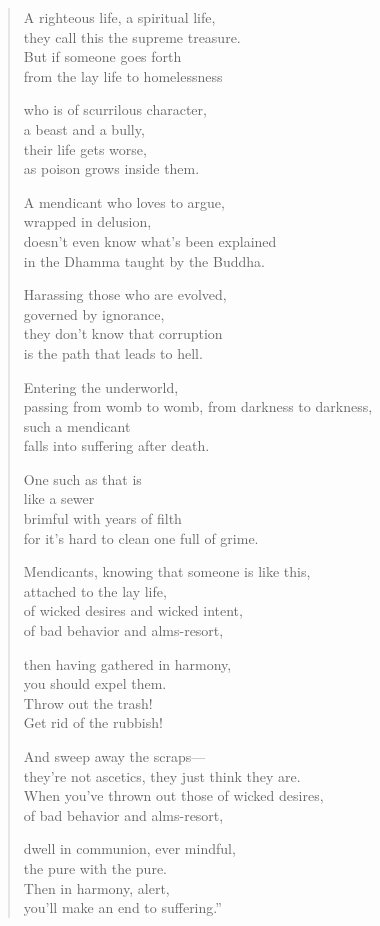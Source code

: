 \documentclass[12pt,openany]{book}%
\begin{document}
\begin{verse}%
A righteous life, a spiritual life, \\
they call this the supreme treasure. \\
But if someone goes forth \\
from the lay life to homelessness 

who is of scurrilous character, \\
a beast and a bully, \\
their life gets worse, \\
as poison grows inside them. 

A mendicant who loves to argue, \\
wrapped in delusion, \\
doesn’t even know what’s been explained \\
in the Dhamma taught by the Buddha. 

Harassing those who are evolved, \\
governed by ignorance, \\
they don’t know that corruption \\
is the path that leads to hell. 

Entering the underworld, \\
passing from womb to womb, from darkness to darkness, \\
such a mendicant \\
falls into suffering after death. 

One such as that is \\
like a sewer \\
brimful with years of filth \\
for it’s hard to clean one full of grime. 

Mendicants, knowing that someone is like this, \\
attached to the lay life, \\
of wicked desires and wicked intent, \\
of bad behavior and alms-resort, 

then having gathered in harmony, \\
you should expel them. \\
Throw out the trash! \\
Get rid of the rubbish! 

And sweep away the scraps—\\
they’re not ascetics, they just think they are. \\
When you’ve thrown out those of wicked desires, \\
of bad behavior and alms-resort, 

dwell in communion, ever mindful, \\
the pure with the pure. \\
Then in harmony, alert, \\
you’ll make an end to suffering.” 

%
\end{verse}
\end{document}
